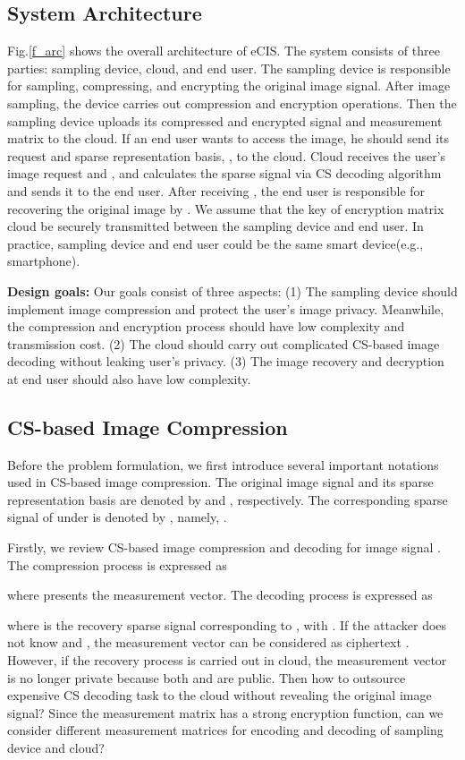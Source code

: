 \documentclass[conference]{IEEEtran}
\begin{document}
\subsection{System Architecture}
Fig.\ref{f_arc} shows the overall architecture of eCIS. The system consists of three parties: sampling device, cloud, and end user.
The sampling device is responsible for sampling, compressing, and encrypting the original image signal. After image sampling, the device carries out compression and encryption operations.  Then the sampling device uploads its compressed and encrypted signal  and  measurement matrix  to the cloud. If an end user wants to access the image, he should send its request and sparse representation basis, , to the cloud. Cloud receives the user's image request and , and calculates the sparse signal  via CS decoding algorithm and sends it to the end user.
After receiving , the end user is responsible for recovering the original image   by .
We assume that the key of encryption matrix cloud be securely transmitted between the sampling device and end user. In practice,  sampling device and end user could be the same smart device(e.g., smartphone).


\textbf{Design goals:}
Our goals  consist of three aspects:
(1) The sampling device should implement image compression and protect the user's image privacy. Meanwhile, the compression and encryption process should have low complexity and transmission cost.
(2) The cloud  should carry out complicated CS-based image decoding without leaking user's privacy.
(3) The image recovery and decryption at end user should also have low complexity.

\subsection{CS-based Image Compression}
Before the problem formulation, we first introduce several important notations used in CS-based image compression. The original image signal and its sparse representation basis are denoted by  and , respectively. The corresponding sparse signal of  under  is denoted by , namely, .

Firstly, we review CS-based image compression and decoding for image signal . The compression process is expressed as

where  presents the measurement vector. The decoding process is expressed as

where  is the recovery sparse signal corresponding to , with .
If the attacker does not know   and  , the measurement vector  can be considered as ciphertext  \cite{orsdemir2008security}. However, if the recovery process is carried out in cloud, the measurement vector  is no longer private  because both   and  are public.
Then how to outsource expensive CS decoding task to the cloud without revealing the original image signal? Since the measurement matrix has a strong encryption function, can we consider different measurement matrices for encoding and decoding of sampling device and cloud?
\end{document}
